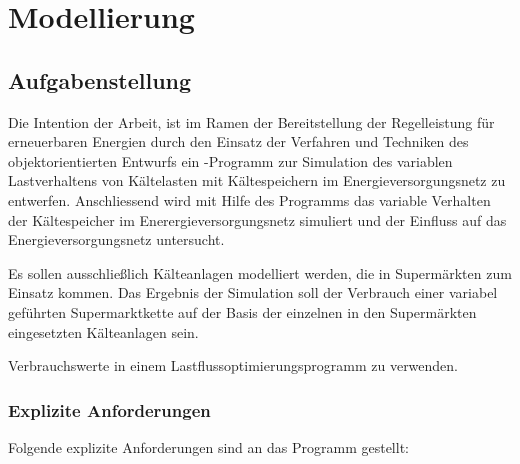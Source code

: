 \chapter{Modellierung}
\label{chap:SEVN}
\minitoc

\section{Aufgabenstellung}
\label{sec:aufst}


Die Intention der Arbeit, ist im Ramen der Bereitstellung der Regelleistung
f\"ur erneuerbaren Energien durch den Einsatz der Verfahren und Techniken des
objektorientierten Entwurfs ein \matlab-Programm zur Simulation des variablen
Lastverhaltens von Kältelasten mit Kältespeichern im Energieversorgungsnetz zu
entwerfen. Anschliessend wird mit Hilfe des Programms das variable Verhalten der
K\"altespeicher im Enerergieversorgungsnetz simuliert und der Einfluss auf das
Energieversorgungsnetz untersucht.

Es sollen ausschlie\ss lich K\"alteanlagen modelliert werden, die in
Superm\"arkten zum Einsatz kommen. Das Ergebnis der Simulation soll der
Verbrauch einer variabel gef\"uhrten Supermarktkette auf der Basis der einzelnen
in den Superm\"arkten eingesetzten K\"alteanlagen sein.

Verbrauchswerte in einem Lastflussoptimierungsprogramm zu verwenden.

\subsection*{Explizite Anforderungen}

Folgende explizite Anforderungen sind an das Programm gestellt:

